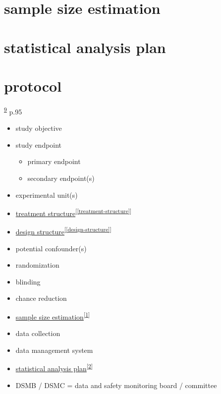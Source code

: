 \documentclass[
]{book}
\providecommand{\tightlist}{%
  \setlength{\itemsep}{0pt}\setlength{\parskip}{0pt}}
\theoremstyle{definition}
\theoremstyle{definition}
\theoremstyle{definition}
\theoremstyle{definition}
\theoremstyle{remark}
\begin{document}
\hypertarget{sample-size-estimation}{%
\section{sample size estimation}\label{sample-size-estimation}}

\hypertarget{statistical-analysis-plan}{%
\section{statistical analysis plan}\label{statistical-analysis-plan}}

\hypertarget{protocol}{%
\section{protocol}\label{protocol}}

\textsuperscript{\protect\hyperlink{ref-hu2022}{9}} p.95

\begin{itemize}
\tightlist
\item
  study objective
\item
  study endpoint

  \begin{itemize}
  \tightlist
  \item
    primary endpoint
  \item
    secondary endpoint(s)
  \end{itemize}
\item
  experimental unit(s)
\item
  \protect\hyperlink{treatment-structure}{treatment structure}\textsuperscript{{[}\ref{treatment-structure}{]}}
\item
  \protect\hyperlink{design-structure}{design structure}\textsuperscript{{[}\ref{design-structure}{]}}
\item
  potential confounder(s)
\item
  randomization
\item
  blinding
\item
  chance reduction
\item
  \protect\hyperlink{sample-size-estimation}{sample size estimation}\textsuperscript{{[}\ref{sample-size-estimation}{]}}
\item
  data collection
\item
  data management system
\item
  \protect\hyperlink{statistical-analysis-plan}{statistical analysis plan}\textsuperscript{{[}\ref{statistical-analysis-plan}{]}}
\item
  DSMB / DSMC = data and safety monitoring board / committee
\end{itemize}
\end{document}
